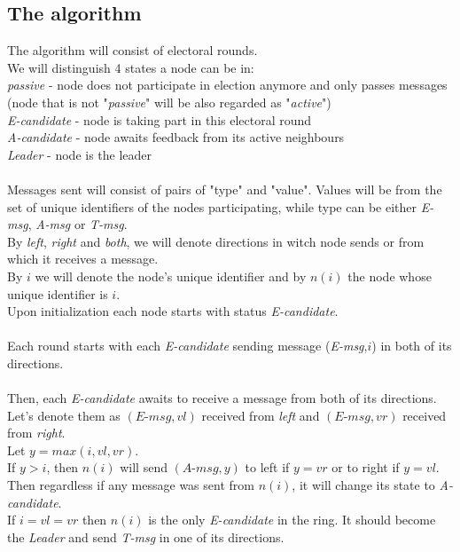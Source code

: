 \documentclass{article}
\begin{document}
\subsection*{The algorithm}
The algorithm will consist of electoral rounds.\\
We will distinguish 4 states a node can be in:\\
\textit{passive} - node does not participate in election anymore and only passes messages\\
(node that is not "\textit{passive}" will be also regarded as "\textit{active}")\\
\textit{E-candidate} - node is taking part in this electoral round\\ \textit{A-candidate} - node awaits feedback from its active neighbours\\ \textit{Leader} - node is the leader\\
\\
Messages sent will consist of pairs of "type" and "value". Values will be from the set of unique identifiers of the nodes participating, while type can be  either \textit{E-msg}, \textit{A-msg} or \textit{T-msg}.\\
By  \textit{left}, \textit{right} and  \textit{both}, we will denote directions in witch node sends or from which it receives a message.\\
By $i$ we will denote the node's unique identifier and by $n(i)$ the node whose unique identifier is $i$.
\\
Upon initialization each node starts with status \textit{E-candidate}.\\
\\
Each round starts with each \textit{E-candidate} sending message (\textit{E-msg},$i$) in both of its directions.\\
\\
Then, each \textit{E-candidate} awaits to receive a message from both of its directions.\\
Let's denote them as $(\textit{E-msg},vl)$ received from \textit{left} and $(\textit{E-msg},vr)$ received from \textit{right}.\\
Let $y=max(i,vl,vr)$. \\
If $y>i$, then $n(i)$ will send $(\textit{A-msg},y)$ to left if $y=vr$ or to right if $y=vl$.\\
Then regardless if any message was sent from $n(i)$, it will change its state to \textit{A-candidate}.\\
If $i=vl=vr$ then $n(i)$ is the only \textit{E-candidate} in the ring. It should become the \textit{Leader} and send \textit{T-msg} in one of its directions.\\
\end{document}

